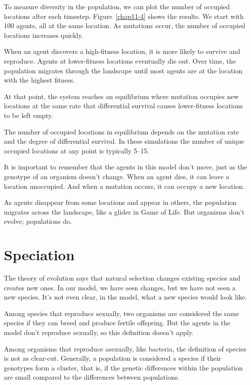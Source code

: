 \documentclass[12pt]{book}
\theoremstyle{exercise}
\begin{document}
To measure diversity in the population, we can plot the number of occupied locations after each timestep.  Figure~\ref{chap11-4} shows the results.  We start with 100 agents, all at the same location.  As mutations occur, the number of occupied locations increases quickly.

When an agent discovers a high-fitness location, it is more likely to survive and reproduce.  Agents at lower-fitness locations eventually die out.  Over time, the population migrates through the landscape until most agents are at the location with the highest fitness.

At that point, the system reaches an equilibrium where mutation occupies new locations at the same rate that differential survival causes lower-fitness locations to be left empty.

The number of occupied locations in equilibrium depends on the mutation rate and the degree of differential survival.  In these simulations the number of unique occupied locations at any point is typically 5--15.

It is important to remember that the agents in this model don't move, just as the genotype of an organism doesn't change.  When an agent dies, it can leave a location unoccupied.  And when a mutation occurs, it can occupy a new location.

As agents disappear from some locations and appear in others, the population migrates across the landscape, like a glider in Game of Life.  But organisms don't evolve; populations do.


\section{Speciation}

The theory of evolution says that natural selection changes existing species and creates new ones.  In our model, we have seen changes, but we have not seen a new species.  It's not even clear, in the model, what a new species would look like.

Among species that reproduce sexually, two organisms are considered the same species if they can breed and produce fertile offspring.  But the agents in the model don't reproduce sexually, so this definition doesn't apply.

Among organisms that reproduce asexually, like bacteria, the definition of species is not as clear-cut.  Generally, a population is considered a species if their genotypes form a cluster, that is, if the genetic differences within the population are small compared to the differences between populations.
\end{document}
